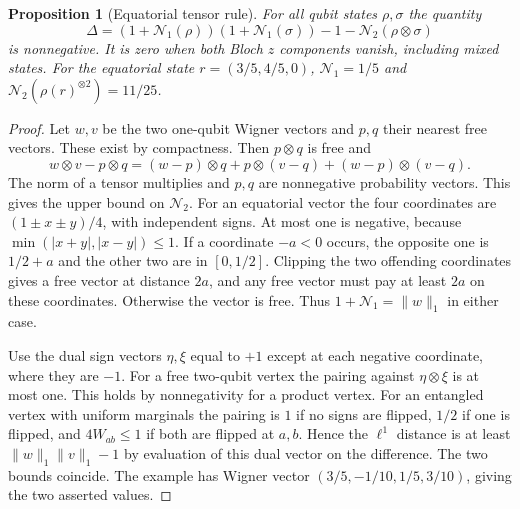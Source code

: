 \documentclass[aps,pra,onecolumn,superscriptaddress,nofootinbib,10pt]{revtex4-2}
\newtheorem{proposition}[theorem]{Proposition}
\theoremstyle{definition}
\theoremstyle{remark}
\begin{document}
\begin{proposition}[Equatorial tensor rule]\label{ob:wignertensor}
For all qubit states \(\rho,\sigma\) the quantity
\[
 \Delta=(1+\mathcal N_1(\rho))(1+\mathcal N_1(\sigma))-1-\mathcal N_2(\rho\otimes\sigma)
\]
is nonnegative. It is zero when both Bloch \(z\) components
vanish, including mixed states. For the equatorial state
\(r=(3/5,4/5,0)\), \(\mathcal N_1=1/5\) and \(\mathcal N_2(\rho(r)^{\otimes2})=11/25\).
\end{proposition}
\begin{proof}
Let \(w,v\) be the two one-qubit Wigner vectors and \(p,q\)
their nearest free vectors. These exist by compactness. Then
\(p\otimes q\) is free and
\[
 w\otimes v-p\otimes q=(w-p)\otimes q+p\otimes(v-q)
                     +(w-p)\otimes(v-q).
\]
The norm of a tensor multiplies and \(p,q\) are nonnegative
probability vectors. This gives the upper bound on \(\mathcal N_2\).
For an equatorial vector the four coordinates are
\((1\pm x\pm y)/4\), with independent signs. At most one is
negative, because \(\min(|x+y|,|x-y|)\le1\).
If a coordinate \(-a<0\) occurs, the opposite one is \(1/2+a\)
and the other two are in \([0,1/2]\). Clipping the two offending
coordinates gives a free vector at distance \(2a\), and any free
vector must pay at least \(2a\) on these coordinates. Otherwise
the vector is free. Thus \(1+\mathcal N_1=\|w\|_1\) in either case.

Use the dual sign vectors \(\eta,\xi\) equal to \(+1\) except
at each negative coordinate, where they are \(-1\). For a free
two-qubit vertex the pairing against \(\eta\otimes\xi\) is at
most one. This holds by nonnegativity for a product vertex.
For an entangled vertex with uniform marginals the pairing is
\(1\) if no signs are flipped, \(1/2\) if one is flipped, and
\(4W_{ab}\le1\) if both are flipped at \(a,b\).
Hence the \(\ell^1\) distance is at least
\(\|w\|_1\|v\|_1-1\) by evaluation of this dual vector on the
difference. The two bounds coincide. The example has Wigner vector
\((3/5,-1/10,1/5,3/10)\), giving the two asserted values.
\end{proof}
\end{document}
